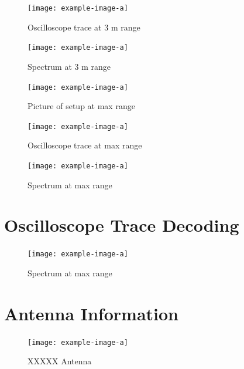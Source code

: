 \documentclass[letterpaper,12pt]{article}
\begin{document}
\begin{figure}[H]
	\begin{centering}
		\texttt{[image: example-image-a]}
		\caption{Oscilloscope trace at 3 m range}
	\end{centering}
\end{figure}

\begin{figure}[H]
	\begin{centering}
		\texttt{[image: example-image-a]}
		\caption{Spectrum at 3 m range}
	\end{centering}
\end{figure}

\begin{figure}[H]
	\begin{centering}
		\texttt{[image: example-image-a]}
		\caption{Picture of setup at max range}
	\end{centering}
\end{figure}

\begin{figure}[H]
	\begin{centering}
		\texttt{[image: example-image-a]}
		\caption{Oscilloscope trace at max range}
	\end{centering}
\end{figure}

\begin{figure}[H]
	\begin{centering}
		\texttt{[image: example-image-a]}
		\caption{Spectrum at max range}
	\end{centering}
\end{figure}


\newpage
\section{Oscilloscope Trace Decoding}
\begin{figure}[H]
	\begin{centering}
		\texttt{[image: example-image-a]}
		\caption{Spectrum at max range}
	\end{centering}
\end{figure}

\newpage
\section{Antenna Information}
\begin{figure}[H]
	\begin{centering}
		\texttt{[image: example-image-a]}
		\caption{XXXXX Antenna}
	\end{centering}
\end{figure}
\end{document}

